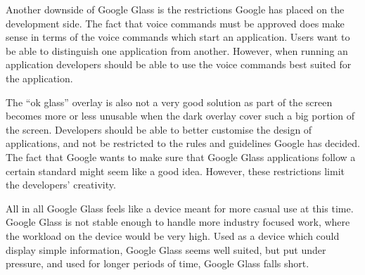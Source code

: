Another downside of Google Glass is the restrictions Google has placed on the development side. The fact that voice commands must be approved does make sense in terms of the voice commands which start an application. Users want to be able to distinguish one application from another. However, when running an application developers should be able to use the voice commands best suited for the application.

The ``ok glass'' overlay is also not a very good solution as part of the screen becomes more or less unusable when the dark overlay cover such a big portion of the screen. Developers should be able to better customise the design of applications, and not be restricted to the rules and guidelines Google has decided. The fact that Google wants to make sure that Google Glass applications follow a certain standard might seem like a good idea. However, these restrictions limit the developers' creativity.

All in all Google Glass feels like a device meant for more casual use at this time. Google Glass is not stable enough to handle more industry focused work, where the workload on the device would be very high. Used as a device which could display simple information, Google Glass seems well suited, but put under pressure, and used for longer periods of time, Google Glass falls short.





